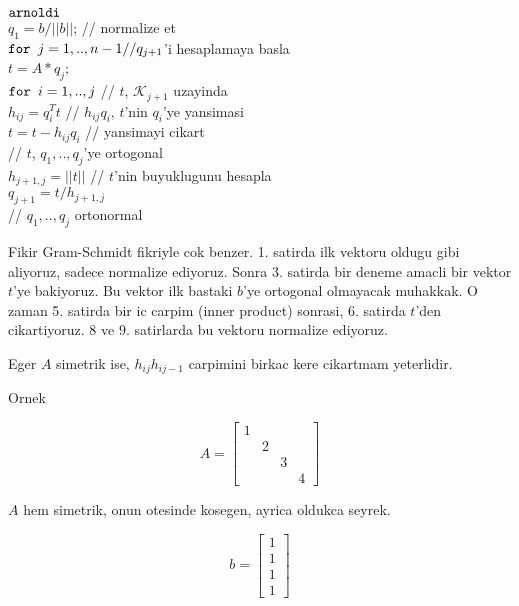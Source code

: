\documentclass[12pt,fleqn]{article}\usepackage{../common}
\begin{document}
\begin{algorithm}[h]
\begin{pseudocode}
\codename $\mbox{\texttt{arnoldi}}$\\
\codeline $q_1 = b / ||b||$; // normalize et\\
\codeline $\mbox{\texttt{for }}j = 1,..,n-1 // q_{j+1}$'i hesaplamaya basla\\
\codeline \> $t = A * q_j$;\\
\codeline \> $\mbox{\texttt{for }}i = 1,..,j $ // $t$, $\mathscr{K}_{j+1}$ uzayinda\\
\codeline \> \>  $h_{ij} = q_i^T t$  // $h_{ij}q_i$, $t$'nin $q_i$'ye yansimasi\\
\codeline \> \>   $t = t - h_{ij}q_i$ // yansimayi cikart \\
\codeline // $t$, $q_1,..,q_j$'ye ortogonal\\
\codeline $h_{j+1,j} = ||t||$ //  $t$'nin buyuklugunu hesapla\\
\codeline $q_{j+1} = t / h_{j+1,j}$\\
\codeline // $q_1,..,q_j$ ortonormal
\end{pseudocode}
\end{algorithm}


Fikir Gram-Schmidt fikriyle cok benzer. 1. satirda ilk vektoru oldugu gibi
aliyoruz, sadece normalize ediyoruz. Sonra 3. satirda bir deneme
amacli bir vektor $t$'ye  bakiyoruz. Bu vektor ilk bastaki $b$'ye ortogonal
olmayacak muhakkak. O zaman 5. satirda bir ic carpim (inner product)
sonrasi, 6. satirda $t$'den cikartiyoruz. 8 ve 9. satirlarda bu
vektoru normalize ediyoruz. 

Eger $A$ simetrik ise, $h_{ij}h_{ij-1}$ carpimini birkac kere cikartmam
yeterlidir. 

Ornek 

\[  
A = 
\left[\begin{array}{rrrr}
1 &&& \\
 & 2 && \\
 && 3 & \\
 &&& 4 
\end{array}\right]
\]

$A$ hem simetrik, onun otesinde kosegen, ayrica oldukca seyrek. 

\[  
b = 
\left[\begin{array}{r}
1 \\ 1\\ 1 \\ 1
\end{array}\right]
\]
\end{document}
